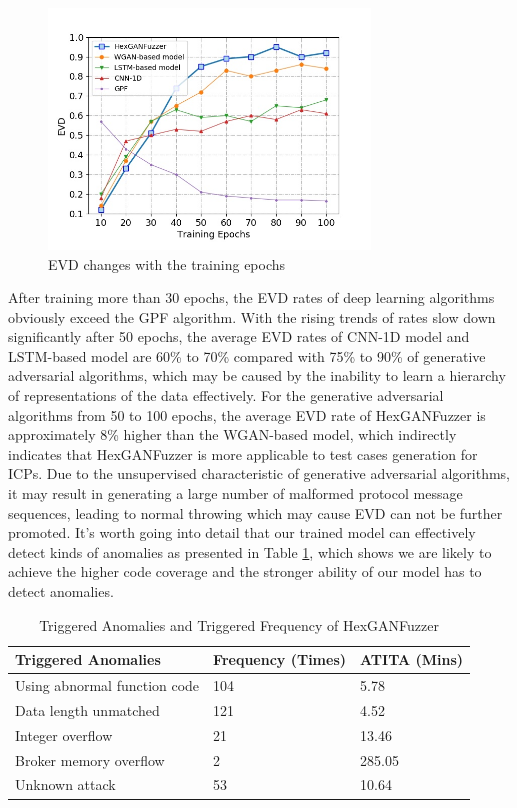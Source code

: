 \begin{figure}[t]
	\centering
	\includegraphics[width=3.36in]{FIGURE_EVD.jpg}
	\caption{EVD changes with the training epochs}
	\label{FIGURE_EVD}
\end{figure}
After training more than 30 epochs, the EVD rates of deep learning algorithms obviously exceed the GPF algorithm. With the rising trends of rates slow down significantly after 50 epochs, the average EVD rates of CNN-1D model and LSTM-based model are 60\% to 70\% compared with 75\% to 90\% of generative adversarial algorithms, which may be caused by the inability to learn a hierarchy of representations of the data effectively. For the generative adversarial algorithms from 50 to 100 epochs, the average EVD rate of HexGANFuzzer is approximately 8\% higher than the WGAN-based model, which indirectly indicates that HexGANFuzzer is more applicable to test cases generation for ICPs. Due to the unsupervised characteristic of generative adversarial algorithms, it may result in generating a large number of malformed protocol message sequences, leading to normal throwing which may cause EVD can not be further promoted. It's worth going into detail that our trained model can effectively detect kinds of anomalies as presented in Table \ref{Triggered_Anomalies_HexGANFuzzer}, which shows we are likely to achieve the higher code coverage and the stronger ability of our model has to detect anomalies.
\begin{table}[htbp]
	\caption{Triggered Anomalies and Triggered Frequency of HexGANFuzzer}
	\label{Triggered_Anomalies_HexGANFuzzer}
	\centering
	\begin{tabular}{m{100pt}<{\centering}  m{40pt}<{\centering} m{50pt}<{\centering} }
		\toprule
		\bfseries Triggered Anomalies &  \bfseries Frequency (Times) & \bfseries ATITA (Mins)\\
		\midrule
		Using abnormal function code & 104 & 5.78\\
		Data length unmatched & 121 & 4.52\\
		Integer overflow & 21 & 13.46 \\
		Broker memory overflow & 2 & 285.05 \\
		Unknown attack & 53 &10.64\\
		\bottomrule
	\end{tabular}
\end{table}

